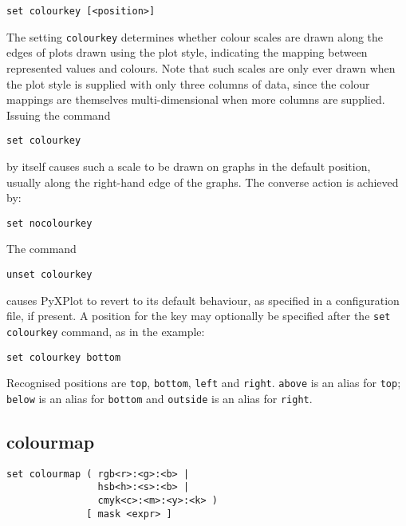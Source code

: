 \begin{verbatim}
set colourkey [<position>]
\end{verbatim}

The setting {\tt colourkey} determines whether colour scales are drawn along
the edges of plots drawn using the  plot style, indicating
the mapping between represented values and colours. Note that such scales are
only ever drawn when the  plot style is supplied with only
three columns of data, since the colour mappings are themselves
multi-dimensional when more columns are supplied. Issuing the command

\begin{verbatim}
set colourkey
\end{verbatim}

\noindent by itself causes such a scale to be drawn on graphs in the default
position, usually along the right-hand edge of the graphs. The converse action
is achieved by:

\begin{verbatim}
set nocolourkey
\end{verbatim}

\noindent The command

\begin{verbatim}
unset colourkey
\end{verbatim}

\noindent causes PyXPlot to revert to its default behaviour, as specified in a
configuration file, if present. A position for the key may optionally be
specified after the {\tt set colourkey} command, as in the example:

\begin{verbatim}
set colourkey bottom
\end{verbatim}

Recognised positions are {\tt top}, {\tt bottom}, {\tt left} and {\tt right}.
{\tt above} is an alias for {\tt top}; {\tt below} is an alias for {\tt bottom}
and {\tt outside} is an alias for {\tt right}.


\subsection{colourmap}

\begin{verbatim}
set colourmap ( rgb<r>:<g>:<b> |
                hsb<h>:<s>:<b> |
                cmyk<c>:<m>:<y>:<k> )
              [ mask <expr> ]
\end{verbatim}


